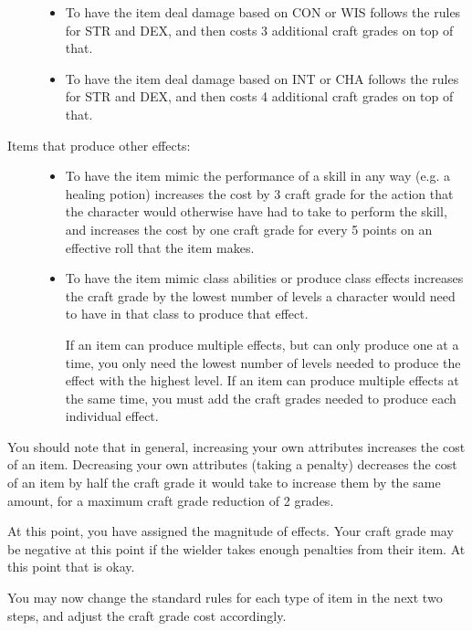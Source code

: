 \begin{description}
\begin{itemize}
		\item To have the item deal damage based on CON or WIS follows the rules for STR and DEX, and then costs 3 additional craft grades on top of that.
		
		\item To have the item deal damage based on INT or CHA follows the rules for STR and DEX, and then costs 4 additional craft grades on top of that.
	\end{itemize}
	\item[Items that produce other effects:] \hfill
	\begin{itemize}
		\item To have the item mimic the performance of a skill in any way (e.g. a healing potion) increases the cost by 3 craft grade for the action that the character would otherwise have had to take to perform the skill, and increases the cost by one craft grade for every 5 points on an effective roll that the item makes.
		\item To have the item mimic class abilities or produce class effects increases the craft grade by the lowest number of levels a character would need to have in that class to produce that effect.
	
		If an item can produce multiple effects, but can only produce one at a time, you only need the lowest number of levels needed to produce the effect with the highest level. If an item can produce multiple effects at the same time, you must add the craft grades needed to produce each individual effect.
	\end{itemize}
\end{description}

You should note that in general, increasing your own attributes increases the cost of an item. Decreasing your own attributes (taking a penalty) decreases the cost of an item by half the craft grade it would take to increase them by the same amount, for a maximum craft grade reduction of 2 grades.

At this point, you have assigned the magnitude of effects. Your craft grade may be negative at this point if the wielder takes enough penalties from their item. At this point that is okay.

You may now change the standard rules for each type of item in the next two steps, and adjust the craft grade cost accordingly.

